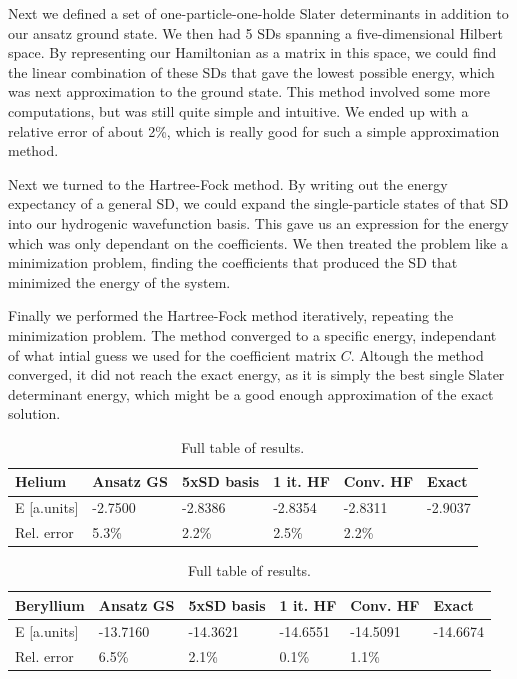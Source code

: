 \documentclass[a4paper, 11pt, notitlepage, english]{article}
\begin{document}
Next we defined a set of one-particle-one-holde Slater determinants in addition to our ansatz ground state. We then had 5 SDs spanning a five-dimensional Hilbert space. By representing our Hamiltonian as a matrix in this space, we could find the linear combination of these SDs that gave the lowest possible energy, which was next approximation to the ground state. This method involved some more computations, but was still quite simple and intuitive. We ended up with a relative error of about 2\%, which is really good for such a simple approximation method.

Next we turned to the Hartree-Fock method. By writing out the energy expectancy of a general SD, we could expand the single-particle states of that SD into our hydrogenic wavefunction basis. This gave us an expression for the energy which was only dependant on the coefficients. We then treated the problem like a minimization problem, finding the coefficients that produced the SD that minimized the energy of the system. 

Finally we performed the Hartree-Fock method iteratively, repeating the minimization problem. The method converged to a specific energy, independant of what intial guess we used for the coefficient matrix $C$. Altough the method converged, it did not reach the exact energy, as it is simply the best single Slater determinant energy, which might be a good enough approximation of the exact solution.

\begin{table}[h!]
\caption{Full table of results.}
\centering
\begin{tabular}{l||l|l|l|l|l}
Helium & Ansatz GS & 5xSD basis & 1 it. HF & Conv. HF & Exact \\ \hline\hline
E [a.units] & -2.7500 & -2.8386 & -2.8354 & -2.8311 & -2.9037 \\
Rel. error & 5.3\% & 2.2\% & 2.5\% & 2.2\% & 
\\ \hline\hline
\end{tabular}

\vspace{1cm}

\begin{tabular}{l||l|l|l|l|l}
Beryllium & Ansatz GS & 5xSD basis & 1 it. HF & Conv. HF & Exact \\ \hline\hline
E [a.units] & -13.7160 & -14.3621 & -14.6551 & -14.5091 & -14.6674 \\
Rel. error & 6.5\% & 2.1\% & 0.1\% & 1.1\% & 
\\ \hline\hline
\end{tabular}
\end{table}
\end{document}
